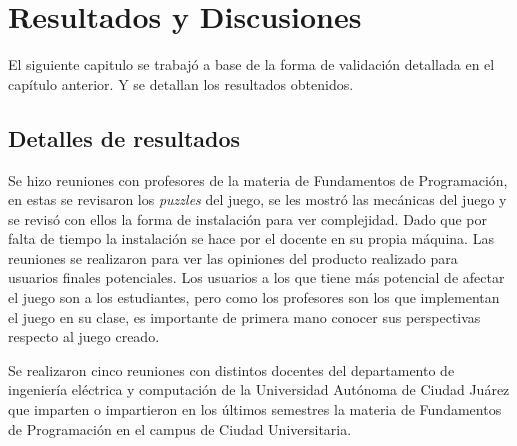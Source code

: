 \chapter{Resultados y Discusiones}
El siguiente capitulo se trabajó a base de la forma de validación detallada en el capítulo anterior. Y se detallan los resultados obtenidos.

\section{Detalles de resultados}
Se hizo reuniones con profesores de la materia de Fundamentos de Programación, en estas se revisaron los \textit{puzzles} del juego, se les mostró las mecánicas del juego y se revisó con ellos la forma de instalación para ver complejidad. Dado que por falta de tiempo la instalación se hace por el docente en su propia máquina. Las reuniones se realizaron para ver las opiniones del producto realizado para usuarios finales potenciales. Los usuarios a los que tiene más potencial de afectar el juego son a los estudiantes, pero como los profesores son los que implementan el juego en su clase, es importante de primera mano conocer sus perspectivas respecto al juego creado.

Se realizaron cinco reuniones con distintos docentes del departamento de ingeniería eléctrica y computación de la Universidad Autónoma de Ciudad Juárez que imparten o impartieron en los últimos semestres la materia de Fundamentos de Programación en el campus de Ciudad Universitaria.

